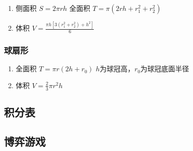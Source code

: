 \documentclass[landscape,twocolumn,a4paper]{article}
\begin{document}
	\begin{enumerate}
		\item 侧面积
		$S=2\pi rh$   全面积
		$T=\pi(2rh+r_1^2+r_2^2)$
		\item 体积
		$V=\frac{\pi h[3(r_1^2+r_2^2)+h^2]}{6}$
	\end{enumerate}

	\subsubsection*{球扇形}

	\begin{enumerate}
		\item 全面积
		$T=\pi r(2h+r_0)$
		$h$为球冠高，$r_0$为球冠底面半径
		\item 体积
		$V=\frac{2}{3}\pi r^2h$
	\end{enumerate}

	\subsection{积分表}
	

	\subsection{博弈游戏}
	
\end{document}
